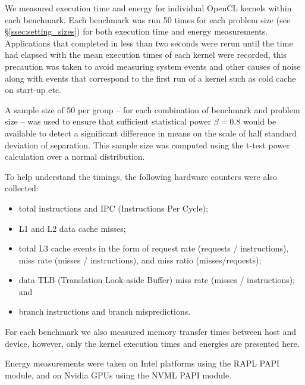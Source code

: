 \documentclass[../document.tex]{subfiles}
\begin{document}
\label{ssec:measurements}


We measured execution time and energy for individual OpenCL kernels within each benchmark.
Each benchmark was run 50 times for each problem size (see \S\ref{ssec:setting_sizes}) for both execution time and energy measurements.
Applications that completed in less than two seconds were rerun until the time had elapsed with the mean execution times of each kernel were recorded, this precaution was taken to avoid measuring system events and other causes of noise along with events that correspond to the first run of a kernel such as cold cache on start-up etc.

A sample size of 50 per group -- for each combination of benchmark and problem size -- was used to ensure that sufficient statistical power $\beta = 0.8$ would be available to detect a significant difference in means on the scale of half standard deviation of separation.
This sample size was computed using the t-test power calculation over a normal distribution.

To help understand the timings, the following hardware counters were also collected:
\begin{itemize}
	\item total instructions and IPC (Instructions Per Cycle);
	\item L1 and L2 data cache misses;
	\item total L3 cache events in the form of request rate (requests / instructions), miss rate (misses / instructions), and miss ratio (misses/requests);
	\item data TLB (Translation Look-aside Buffer) miss rate (misses / instructions); and
	\item branch instructions and branch mispredictions.
\end{itemize}
For each benchmark we also measured memory transfer times between host and device, however, only the kernel execution times and energies are presented here.

Energy measurements were taken on Intel platforms using the RAPL PAPI module, and on Nvidia GPUs using the NVML PAPI module.
\end{document}
